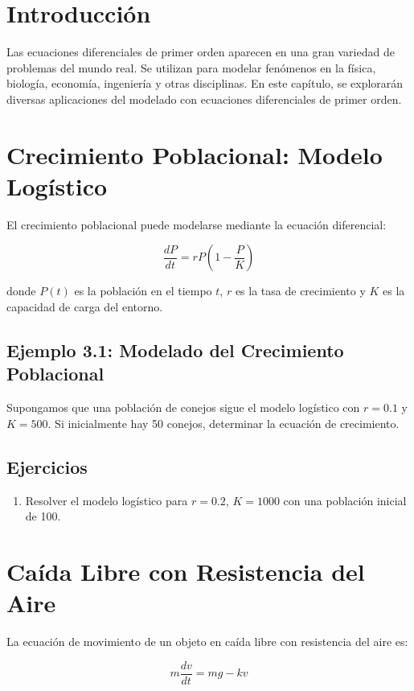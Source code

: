 \section{Introducción}
Las ecuaciones diferenciales de primer orden aparecen en una gran variedad de problemas del mundo real. 
Se utilizan para modelar fenómenos en la física, biología, economía, ingeniería y otras disciplinas.
En este capítulo, se explorarán diversas aplicaciones del modelado con ecuaciones diferenciales de primer orden.

\section{Crecimiento Poblacional: Modelo Logístico}
El crecimiento poblacional puede modelarse mediante la ecuación diferencial:

\begin{equation}
\frac{dP}{dt} = r P \left( 1 - \frac{P}{K} \right)
\end{equation}

donde \( P(t) \) es la población en el tiempo \( t \), \( r \) es la tasa de crecimiento y \( K \) es la capacidad de carga del entorno.

\subsection*{Ejemplo 3.1: Modelado del Crecimiento Poblacional}
Supongamos que una población de conejos sigue el modelo logístico con \( r = 0.1 \) y \( K = 500 \). Si inicialmente hay 50 conejos, determinar la ecuación de crecimiento.

\subsection*{Ejercicios}
\begin{enumerate}
    \item Resolver el modelo logístico para \( r = 0.2 \), \( K = 1000 \) con una población inicial de 100.
\end{enumerate}

\section{Caída Libre con Resistencia del Aire}
La ecuación de movimiento de un objeto en caída libre con resistencia del aire es:

\begin{equation}
m \frac{dv}{dt} = mg - kv
\end{equation}

